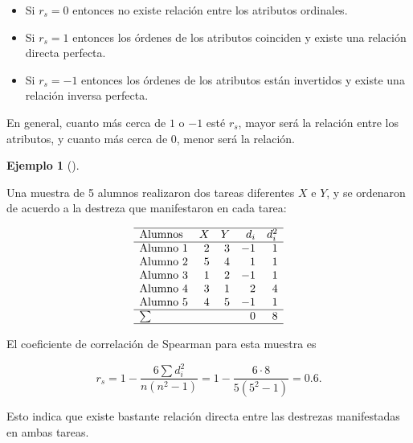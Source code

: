 \documentclass[
  spanish,
  a4paper,
]{scrreport}
\providecommand{\tightlist}{%
  \setlength{\itemsep}{0pt}\setlength{\parskip}{0pt}}
\theoremstyle{plain}
\theoremstyle{definition}
\newtheorem{example}{Ejemplo}[chapter]
\theoremstyle{definition}
\theoremstyle{remark}
\begin{document}
\begin{tcolorbox}[enhanced jigsaw, arc=.35mm, bottomrule=.15mm, bottomtitle=1mm, breakable, colback=white, colbacktitle=quarto-callout-note-color!10!white, colframe=quarto-callout-note-color-frame, coltitle=black, left=2mm, leftrule=.75mm, opacityback=0, opacitybacktitle=0.6, rightrule=.15mm, title=\textcolor{quarto-callout-note-color}{\faInfo}\hspace{0.5em}{Interpretación}, titlerule=0mm, toprule=.15mm, toptitle=1mm]

\begin{itemize}
\tightlist
\item
  Si \(r_s=0\) entonces no existe relación entre los atributos
  ordinales.
\item
  Si \(r_s=1\) entonces los órdenes de los atributos coinciden y existe
  una relación directa perfecta.
\item
  Si \(r_s=-1\) entonces los órdenes de los atributos están invertidos y
  existe una relación inversa perfecta.
\end{itemize}

En general, cuanto más cerca de \(1\) o \(-1\) esté \(r_s\), mayor será
la relación entre los atributos, y cuanto más cerca de \(0\), menor será
la relación.

\end{tcolorbox}

\begin{example}[]\protect\hypertarget{exm-coeficiente-correlacion-spearman}{}\label{exm-coeficiente-correlacion-spearman}

Una muestra de 5 alumnos realizaron dos tareas diferentes \(X\) e \(Y\),
y se ordenaron de acuerdo a la destreza que manifestaron en cada tarea:

\[
\begin{array}{lrrrr}
\hline
\mbox{Alumnos} & X & Y & d_i & d_i^2\\
\hline
\mbox{Alumno 1} & 2 & 3 & -1 & 1\\
\mbox{Alumno 2} & 5 & 4 & 1 & 1 \\
\mbox{Alumno 3} & 1 & 2 & -1 & 1\\
\mbox{Alumno 4} & 3 & 1 & 2 & 4\\
\mbox{Alumno 5} & 4 & 5 & -1 & 1\\
\hline
\sum &  &  & 0 & 8 \\
\hline
\end{array}
\]

El coeficiente de correlación de Spearman para esta muestra es

\[
r_s = 1-\frac{6\sum d_i^2}{n(n^2-1)} = 1- \frac{6\cdot 8}{5(5^2-1)} = 0.6.
\]

Esto indica que existe bastante relación directa entre las destrezas
manifestadas en ambas tareas.

\end{example}
\end{document}
